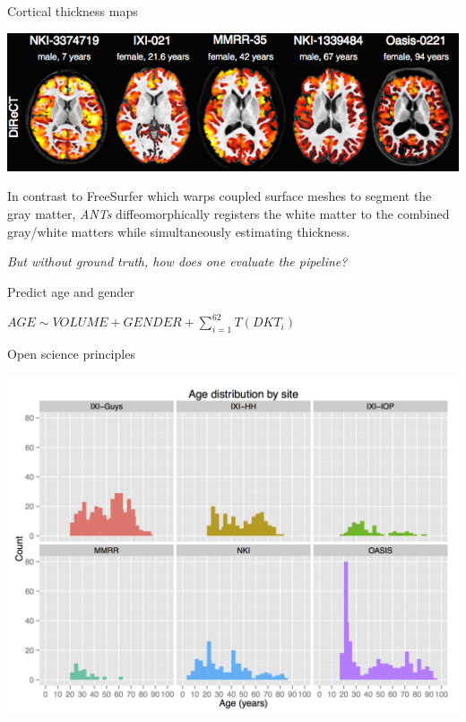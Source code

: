 \documentclass[ignorenonframetext,]{beamer}
\begin{document}
\begin{frame}{Cortical thickness maps}

\includegraphics{./evaluation/figures/corticalThicknessEstimation.png}

In contrast to FreeSurfer which warps coupled surface meshes to segment
the gray matter, \emph{ANTs} diffeomorphically registers the white
matter to the combined gray/white matters while simultaneously
estimating thickness.

\end{frame}

\begin{frame}

\emph{But without ground truth, how does one evaluate the pipeline?}

\end{frame}

\begin{frame}{Predict age and gender}

\(AGE \sim VOLUME + GENDER + \sum_{i=1}^{62} T(DKT_i)\)

\end{frame}

\begin{frame}{Open science principles}

\includegraphics{./evaluation/figures/ageDistribution.png}

\end{frame}
\end{document}
